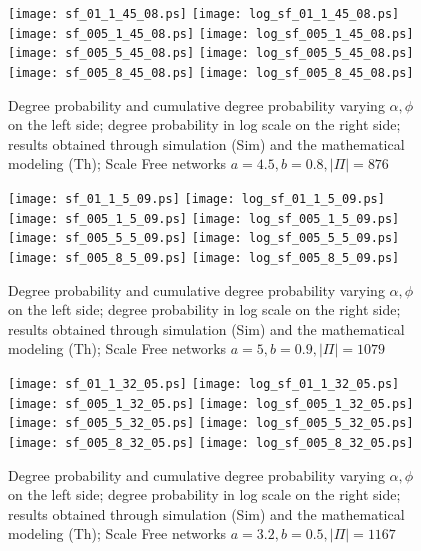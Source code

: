 \documentclass[a4paper,twosided]{article}
\begin{document}
\begin{figure}
   \centering
   \texttt{[image: sf\_01\_1\_45\_08.ps]}
   \texttt{[image: log\_sf\_01\_1\_45\_08.ps]}
   \texttt{[image: sf\_005\_1\_45\_08.ps]}
   \texttt{[image: log\_sf\_005\_1\_45\_08.ps]}
   \texttt{[image: sf\_005\_5\_45\_08.ps]}
   \texttt{[image: log\_sf\_005\_5\_45\_08.ps]}
   \texttt{[image: sf\_005\_8\_45\_08.ps]}
   \texttt{[image: log\_sf\_005\_8\_45\_08.ps]}
   \caption{Degree probability and cumulative degree probability varying $\alpha, \phi$ on the left side; degree probability in log scale on the right side; results obtained through simulation (Sim) and the mathematical modeling (Th); Scale Free networks $a=4.5, b=0.8, |\Pi|=876$}
   \label{fig:fig_sf11}
\end{figure}

\begin{figure}
   \centering
   \texttt{[image: sf\_01\_1\_5\_09.ps]}
   \texttt{[image: log\_sf\_01\_1\_5\_09.ps]}
   \texttt{[image: sf\_005\_1\_5\_09.ps]}
   \texttt{[image: log\_sf\_005\_1\_5\_09.ps]}
   \texttt{[image: sf\_005\_5\_5\_09.ps]}
   \texttt{[image: log\_sf\_005\_5\_5\_09.ps]}
   \texttt{[image: sf\_005\_8\_5\_09.ps]}
   \texttt{[image: log\_sf\_005\_8\_5\_09.ps]}
   \caption{Degree probability and cumulative degree probability varying $\alpha, \phi$ on the left side; degree probability in log scale on the right side; results obtained through simulation (Sim) and the mathematical modeling (Th); Scale Free networks $a=5, b=0.9, |\Pi|=1079$}
   \label{fig:fig_sf12}
\end{figure}

\begin{figure}
   \centering
   \texttt{[image: sf\_01\_1\_32\_05.ps]}
   \texttt{[image: log\_sf\_01\_1\_32\_05.ps]}
   \texttt{[image: sf\_005\_1\_32\_05.ps]}
   \texttt{[image: log\_sf\_005\_1\_32\_05.ps]}
   \texttt{[image: sf\_005\_5\_32\_05.ps]}
   \texttt{[image: log\_sf\_005\_5\_32\_05.ps]}
   \texttt{[image: sf\_005\_8\_32\_05.ps]}
   \texttt{[image: log\_sf\_005\_8\_32\_05.ps]}
   \caption{Degree probability and cumulative degree probability varying $\alpha, \phi$ on the left side; degree probability in log scale on the right side; results obtained through simulation (Sim) and the mathematical modeling (Th); Scale Free networks $a=3.2, b=0.5, |\Pi|=1167$}
   \label{fig:fig_sf13}
\end{figure}
\end{document}
